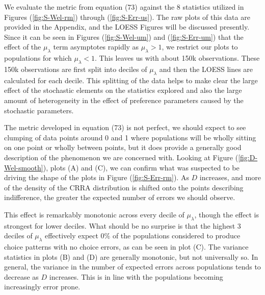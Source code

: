 \documentclass[11pt,a4paper]{article} %
\begin{document}
We evaluate the metric from equation (73) against the 8 statistics utilized in Figures (\ref{fig:S-Wel-rm}) through (\ref{fig:S-Err-us}).
The raw plots of this data are provided in the Appendix, and the LOESS Figures will be discussed presently.
Since it can be seen in Figures (\ref{fig:S-Wel-um}) and (\ref{fig:S-Err-um}) that the effect of the $\mu_\lambda$ term asymptotes rapidly as $\mu_\lambda > 1$, we restrict our plots to populations for which $\mu_\lambda < 1$.
This leaves us with about 150k observations.
These 150k observations are first split into deciles of $\mu_\lambda$ and then the LOESS lines are calculated for each decile.
This splitting of the data helps to make clear the large effect of the stochastic elements on the statistics explored and also the large amount of heterogeneity in the effect of preference parameters caused by the stochastic parameters.

The metric developed in equation (73) is not perfect, we should expect to see clumping of data points around 0 and 1 where populations will be wholly sitting on one point or wholly between points, but it does provide a generally good description of the phenomenon we are concerned with.
Looking at Figure (\ref{fig:D-Wel-smooth}), plots (A) and (C), we can confirm what was suspected to be driving the shape of the plots in Figure (\ref{fig:S-Err-rm}).
As $D$ increases, and more of the density of the CRRA distribution is shifted onto the points describing indifference, the greater the expected number of errors we should observe.

This effect is remarkably monotonic across every decile of $\mu_\lambda$, though the effect is strongest for lower deciles.
What should be no surprise is that the highest 3 deciles of $\mu_\lambda$ effectively expect $0\%$ of the populations considered to produce choice patterns with no choice errors, as can be seen in plot (C).
The variance statistics in plots (B) and (D) are generally monotonic, but not universally so.
In general, the variance in the number of expected errors across populations tends to decrease as $D$ increases.
This is in line with the populations becoming increasingly error prone.
\end{document}

